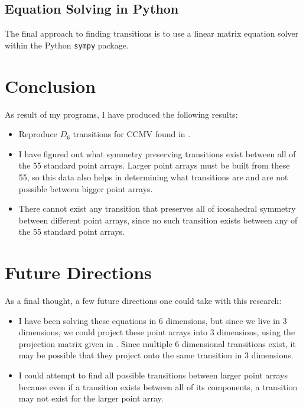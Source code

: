 \documentclass[a4paper,10pt]{article}
\theoremstyle{plain}
\theoremstyle{definition}
\theoremstyle{remark}
\begin{document}
\subsection{Equation Solving in Python}
The final approach to finding transitions is to use a linear matrix equation solver within the Python \texttt{sympy} package.


\section{Conclusion}
As result of my programs, I have produced the following results:
\begin{itemize}
    \item Reproduce \(D_6\) transitions for CCMV found in \cite{indelicatoetal2012}.
    \item I have figured out what symmetry preserving transitions exist between all of the 55 standard point arrays. Larger point arrays must be built from these 55, so this data also helps in determining what transitions are and are not possible between bigger point arrays.
    \item There cannot exist any transition that preserves all of icosahedral symmetry between different point arrays, since no such transition exists between any of the 55 standard point arrays.
\end{itemize}

\section{Future Directions}
As a final thought, a few future directions one could take with this research:
\begin{itemize}
    \item I have been solving these equations in 6 dimensions, but since we live in 3 dimensions, we could project these point arrays into 3 dimensions, using the projection matrix given in \cite{indelicatoetal2012}.
    Since multiple 6 dimensional transitions exist, it may be possible that they project onto the same transition in 3 dimensions.
    \item I could attempt to find all possible transitions between larger point arrays because even if a transition exists between all of its components, a transition may not exist for the larger point array.
\end{itemize}

\medskip

\end{document}
